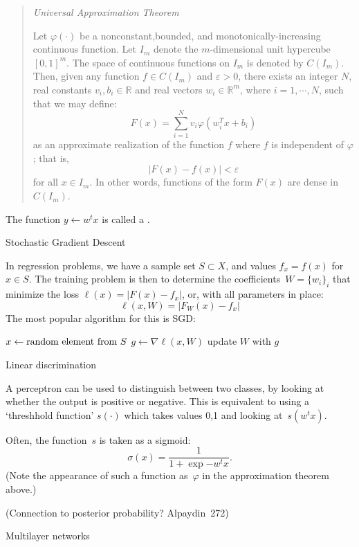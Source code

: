 \begin{quotation}
  \textsl{Universal Approximation Theorem}%

  Let $\varphi(\cdot)$ be a nonconstant,bounded, and
  monotonically-increasing continuous function. Let $I_m$ denote the
  $m$-dimensional unit hypercube $[0,1]^m$. The space
  of continuous functions on $I_m$ is denoted by
  $C(I_m)$. Then, given any function $f\in C(I_m)$
  and $\varepsilon>0$, there exists an integer
  $N$, real constants $v_i,b_i\in\mathbb{R}$ and
  real vectors $w_i \in \mathbb{R}^m$, where
  $i=1,\cdots,N$, such that we may define:
  \[
  F( x ) =
  \sum_{i=1}^{N} v_i \varphi \left( w_i^T x + b_i\right)
  \]
  as an approximate realization of the function $f$ where
  $f$ is independent of $\varphi$; that is,
  \[
  | F( x ) - f ( x ) | < \varepsilon
  \]
  for all $x\in I_m$. In other words, functions of the form
  $F(x)$ are dense in $C(I_m)$.
\end{quotation}

The function $y\leftarrow w^tx$ is called a .

 {Stochastic Gradient Descent}

In regression problems, we have a sample set $S\subset X$, and values
$f_x=f(x)$ for $x\in S$. The training problem is then to determine the
coefficients~$W=\{w_i\}_i$ that minimize the loss $\ell(x)=|F(x)-f_x|$,
or, with all parameters in place:
\[ \ell(x,W) = |F_W(x)-f_x| \]
The most popular algorithm for this is \acf{SGD}:
%
\begin{displayalgorithm}
        { $x\leftarrow\hbox{random element from $S$}$\;
          $g\leftarrow\nabla \ell(x,W)$\;
          update $W$ with $g$\;
          }
\end{displayalgorithm}

 {Linear discrimination}

A perceptron can be used to distinguish between two classes, by
looking at whether the output is positive or negative. This is
equivalent to using a `threshhold function' $s(\cdot)$ which takes
values 0,1 and looking at~$s(w^tx)$.

Often, the function~$s$ is taken as a sigmoid:
\[ \sigma(x) = \frac1{1+\exp{-w^tx}}. \]
(Note the appearance of such a function as~$\varphi$ in the approximation theorem
above.)

(Connection to posterior probability? Alpaydin~272)

 {Multilayer networks}

